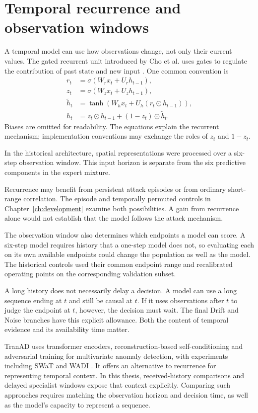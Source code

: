 \section{Temporal recurrence and observation windows}
A temporal model can use how observations change, not only their current values. The gated recurrent unit introduced by Cho et al. uses gates to regulate the contribution of past state and new input \cite{gru}. One common convention is
\begin{align}
 r_t &= \sigma(W_r x_t+U_r h_{t-1}),\\
 z_t &= \sigma(W_z x_t+U_z h_{t-1}),\\
 \widetilde h_t &= \tanh(W_h x_t+U_h(r_t\odot h_{t-1})),\\
 h_t &= z_t\odot h_{t-1}+(1-z_t)\odot\widetilde h_t.
\end{align}
Biases are omitted for readability. The equations explain the recurrent mechanism; implementation conventions may exchange the roles of $z_t$ and $1-z_t$.

In the historical architecture, spatial representations were processed over a six-step observation window. This input horizon is separate from the six predictive components in the expert mixture.

Recurrence may benefit from persistent attack episodes or from ordinary short-range correlation. The episode and temporally permuted controls in Chapter~\ref{ch:development} examine both possibilities. A gain from recurrence alone would not establish that the model follows the attack mechanism.

The observation window also determines which endpoints a model can score. A six-step model requires history that a one-step model does not, so evaluating each on its own available endpoints could change the population as well as the model. The historical controls used their common endpoint range and recalibrated operating points on the corresponding validation subset.

A long history does not necessarily delay a decision. A model can use a long sequence ending at $t$ and still be causal at $t$. If it uses observations after $t$ to judge the endpoint at $t$, however, the decision must wait. The final Drift and Noise branches have this explicit allowance. Both the content of temporal evidence and its availability time matter.

TranAD uses transformer encoders, reconstruction-based self-conditioning and adversarial training for multivariate anomaly detection, with experiments including SWaT and WADI \cite{tranad2022}. It offers an alternative to recurrence for representing temporal context. In this thesis, received-history comparisons and delayed specialist windows expose that context explicitly. Comparing such approaches requires matching the observation horizon and decision time, as well as the model's capacity to represent a sequence.


